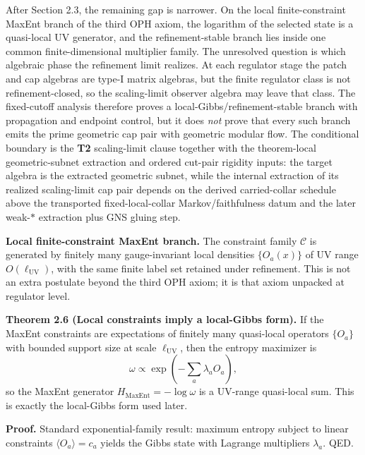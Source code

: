 After Section 2.3, the remaining gap is narrower. On the local finite-constraint MaxEnt branch of the third OPH axiom, the logarithm of the selected state is a quasi-local UV generator, and the refinement-stable branch lies inside one common finite-dimensional multiplier family. The unresolved question is which algebraic phase the refinement limit realizes. At each regulator stage the patch and cap algebras are type-I matrix algebras, but the finite regulator class is not refinement-closed, so the scaling-limit observer algebra may leave that class. The fixed-cutoff analysis therefore proves a local-Gibbs/refinement-stable branch with propagation and endpoint control, but it does \emph{not} prove that every such branch emits the prime geometric cap pair with geometric modular flow. The conditional boundary is the \textbf{T2} scaling-limit clause together with the theorem-local geometric-subnet extraction and ordered cut-pair rigidity inputs: the target algebra is the extracted geometric subnet, while the internal extraction of its realized scaling-limit cap pair depends on the derived carried-collar schedule above the transported fixed-local-collar Markov/faithfulness datum and the later weak-\(*\) extraction plus GNS gluing step.

\textbf{Local finite-constraint MaxEnt branch.} The constraint family \(\mathcal C\) is generated by finitely many gauge-invariant local densities \(\{O_a(x)\}\) of UV range \(O(\ell_{\mathrm{UV}})\), with the same finite label set retained under refinement. This is not an extra postulate beyond the third OPH axiom; it is that axiom unpacked at regulator level.

\textbf{Theorem 2.6 (Local constraints imply a local-Gibbs form).} If the MaxEnt constraints are expectations of finitely many quasi-local operators \(\{O_a\}\) with bounded support size at scale \(\ell_{\mathrm{UV}}\), then the entropy maximizer is
\[
\omega \propto \exp\!\left(-\sum_a \lambda_a O_a\right),
\]
so the MaxEnt generator \(H_{\mathrm{MaxEnt}}=-\log\omega\) is a UV-range quasi-local sum. This is exactly the local-Gibbs form used later.

\textbf{Proof.} Standard exponential-family result: maximum entropy subject to linear constraints \(\langle O_a\rangle=c_a\) yields the Gibbs state with Lagrange multipliers \(\lambda_a\). QED.

